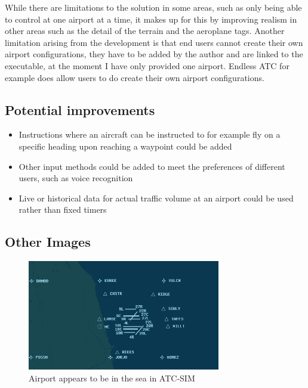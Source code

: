 \documentclass{article}
\begin{document}
While there are limitations to the solution in some areas, such as only being able to control at one airport at a time, it makes up for this by improving realism in other areas such as the detail of the terrain and the aeroplane tags.
Another limitation arising from the development is that end users cannot create their own airport configurations, they have to be added by the author and are linked to the executable, at the moment I have only provided one airport.
Endless ATC for example does allow users to do create their own airport configurations.

\subsection{Potential improvements}
\begin{itemize}
    \item Instructions where an aircraft can be instructed to for example fly on a specific heading upon reaching a waypoint could be added
    \item Other input methods could be added to meet the preferences of different users, such as voice recognition
    \item Live or historical data for actual traffic volume at an airport could be used rather than fixed timers
\end{itemize}

\clearpage

\printbibliography
{}

\printnoidxglossaries

\begin{appendices}

\section{Other Images}\label{appendix:otherimages}
\begin{figure}[H]
\centering
\includegraphics[width=0.75\textwidth]{existing_solutions/airportinseaatcsim.png}
\caption{\label{fig:airportinseaatcsim}Airport appears to be in the sea in ATC-SIM}
\end{figure}
\end{appendices}
\end{document}
